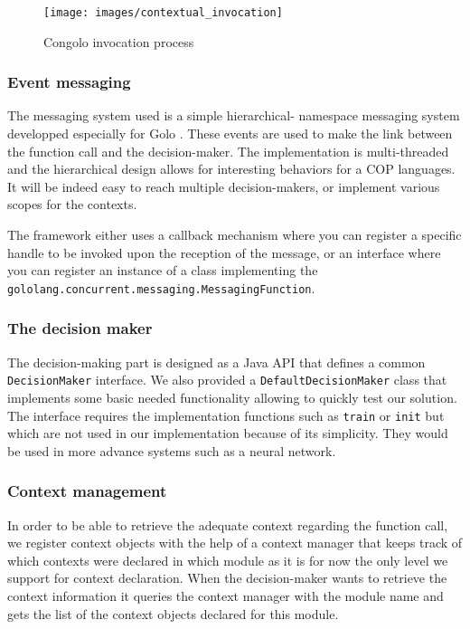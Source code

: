 \documentclass{sig-alternate}
\begin{document}
\begin{center}
\begin{figure}
\centering
\texttt{[image: images/contextual\_invocation]}
\caption{Congolo invocation process}
\label{figure:congoloinvoke}
\end{figure}
\end{center}

\subsubsection{Event messaging}
The messaging system used is a simple hierarchical- namespace messaging system developped especially for Golo \cite{flemouel_gololang-messaging_2013}. These events are used to make the link between the function call and the decision-maker. The implementation is multi-threaded and the hierarchical design allows for interesting behaviors for a COP languages. It will be indeed easy to reach multiple decision-makers, or implement various scopes for the contexts.

The framework either uses a callback mechanism where you can register a specific handle to be invoked upon the reception of the message, or an interface where you can register an instance of a class implementing the \lstinline|gololang.concurrent.messaging.MessagingFunction|.

\subsubsection{The decision maker}
The decision-making part is designed as a Java API that defines a common \lstinline|DecisionMaker| interface. We also provided a \lstinline|DefaultDecisionMaker| class that implements some basic needed functionality allowing to quickly test our solution. The interface requires the implementation functions such as \lstinline|train| or \lstinline|init| but which are not used in our implementation because of its simplicity. They would be used in more advance systems such as a neural network. 

\subsubsection{Context management}
In order to be able to retrieve the adequate context regarding the function call, we register context objects with the help of a context manager that keeps track of which contexts were declared in which module as it is for now the only level we support for context declaration. When the decision-maker wants to retrieve the context information it queries the context manager with the module name and gets the list of the context objects declared for this module.
\end{document}
